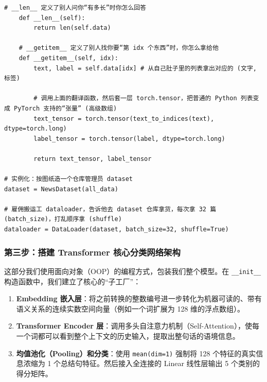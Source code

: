 \documentclass[10pt]{article}
\numberwithin{equation}{section}
\theoremstyle{plain}
\theoremstyle{definition}
\theoremstyle{remark}
\begin{document}
\begin{CodeBox}
\begin{lstlisting}[style=PythonStyle]
    # __len__ 定义了别人问你“有多长”时你怎么回答
    def __len__(self):
        return len(self.data)
    
    # __getitem__ 定义了别人找你要“第 idx 个东西”时，你怎么拿给他
    def __getitem__(self, idx):
        text, label = self.data[idx] # 从自己肚子里的列表拿出对应的 (文字, 标签)
        
        # 调用上面的翻译函数，然后套一层 torch.tensor，把普通的 Python 列表变成 PyTorch 支持的“张量” (高级数组)
        text_tensor = torch.tensor(text_to_indices(text), dtype=torch.long)
        label_tensor = torch.tensor(label, dtype=torch.long)
        
        return text_tensor, label_tensor

# 实例化：按图纸造一个仓库管理员 dataset
dataset = NewsDataset(all_data)

# 雇佣搬运工 dataloader，告诉他去 dataset 仓库拿货，每次拿 32 篇 (batch_size)，打乱顺序拿 (shuffle)
dataloader = DataLoader(dataset, batch_size=32, shuffle=True)
\end{lstlisting}
\end{CodeBox}

\subsubsection{第三步：搭建 Transformer 核心分类网络架构}

这部分我们使用面向对象（OOP）的编程方式，包装我们整个模型。在 \texttt{\_\_init\_\_} 构造函数中，我们建立了核心的“子工厂”：
\begin{enumerate}
	\item \textbf{Embedding 嵌入层}：将之前转换的整数编号进一步转化为机器可读的、带有语义关系的连续实数空间向量（例如一个词扩展为 128 维的浮点数组）。
	\item \textbf{Transformer Encoder 层}：调用多头自注意力机制（Self-Attention），使每一个词都可以看到整个上下文的历史输入，提取出整句话的语境信息。
	\item \textbf{均值池化（Pooling）和分类}：使用 \texttt{mean(dim=1)} 强制将 128 个特征的真实信息浓缩为 1 个总结句特征。然后接入全连接的 Linear 线性层输出 5 个类别的得分矩阵。
\end{enumerate}
\end{document}
